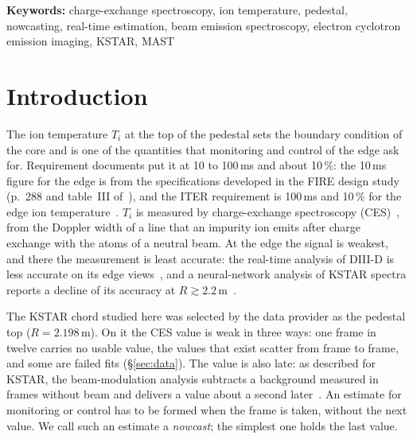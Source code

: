 \documentclass[11pt,a4paper]{article}
\newcommand{\Ti}{\ensuremath{T_i}}
\begin{document}
\noindent\textbf{Keywords:} charge-exchange spectroscopy, ion temperature, pedestal,
nowcasting, real-time estimation, beam emission spectroscopy, electron cyclotron emission
imaging, KSTAR, MAST

\section{Introduction}
\label{sec:intro}

The ion temperature \Ti{} at the top of the pedestal sets the boundary condition of the
core and is one of the quantities that monitoring and control of the edge ask for.
Requirement documents put it at 10 to 100\,ms and about 10\,\%: the 10\,ms figure for the
edge is from the specifications developed in the FIRE design study (p.~288 and table~III
of~\citep{Young2008PlasmaMeasurements}), and the ITER requirement is 100\,ms and 10\,\%
for the edge ion temperature~\citep{Donne2007ChapterDiagnostics}. \Ti{} is measured by
charge-exchange spectroscopy (CES)~\citep{Ko2010ChargeExchange}, from the Doppler width of
a line that an impurity ion emits after charge exchange with the atoms of a neutral beam.
At the edge the signal is weakest, and there the measurement is least accurate: the
real-time analysis of DIII-D is less accurate on its edge
views~\citep{Chrystal2026RealTime}, and a neural-network analysis of KSTAR spectra reports
a decline of its accuracy at $R \gtrsim 2.2$\,m~\citep{Lee2026NeuralNetworkbased}.

The KSTAR chord studied here was selected by the data provider as the pedestal top
($R = 2.198$\,m). On it the CES value is weak in three ways: one frame in twelve carries
no usable value, the values that exist scatter from frame to frame, and some are failed
fits (\S\ref{sec:data}). The value is also late: as described for KSTAR, the
beam-modulation analysis subtracts a background measured in frames without beam and
delivers a value about a second
later~\citep{Lee2020TwoGaussian,Lee2026NeuralNetworkbased}. An estimate for monitoring
or control has to be formed when the frame is taken, without the next value. We call such
an estimate a \emph{nowcast}; the simplest one holds the last value.
\end{document}
